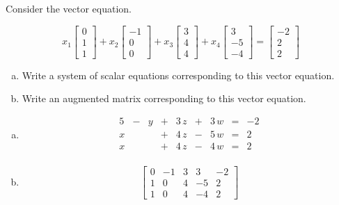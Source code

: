 
\begin{exerciseStatement}


Consider the vector equation.

\[ x_{1} \left[\begin{array}{c}
0 \\
1 \\
1
\end{array}\right] + x_{2} \left[\begin{array}{c}
-1 \\
0 \\
0
\end{array}\right] + x_{3} \left[\begin{array}{c}
3 \\
4 \\
4
\end{array}\right] + x_{4} \left[\begin{array}{c}
3 \\
-5 \\
-4
\end{array}\right] = \left[\begin{array}{c}
-2 \\
2 \\
2
\end{array}\right] \]
\begin{enumerate}[(a)]
\item  Write a system of scalar equations corresponding to this vector equation. 
\item  Write an augmented matrix corresponding to this vector equation. 
\end{enumerate}
    
\end{exerciseStatement}
    
\begin{exerciseAnswer} 

\begin{enumerate}[(a)]
\item 
\begin{alignat*}{5}  &-& y &+& 3 \, z &+& 3 \, {w} &=& -2 \\x & &  &+& 4 \, z &-& 5 \, {w} &=& 2 \\x & &  &+& 4 \, z &-& 4 \, {w} &=& 2 \\ \end{alignat*}
            
\item \[ \left[\begin{array}{cccc|c}
0 & -1 & 3 & 3 & -2 \\
1 & 0 & 4 & -5 & 2 \\
1 & 0 & 4 & -4 & 2
\end{array}\right] \]
\end{enumerate}
    
\end{exerciseAnswer}
    
